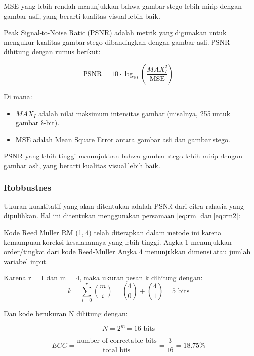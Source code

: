 \documentclass{ittelkom}
\begin{document}
MSE yang lebih rendah menunjukkan bahwa gambar stego lebih mirip dengan gambar
asli, yang berarti kualitas visual lebih baik.

Peak Signal-to-Noise Ratio (PSNR) adalah metrik yang digunakan untuk mengukur
kualitas gambar stego dibandingkan dengan gambar asli. PSNR dihitung dengan
rumus berikut:

\begin{equation}
    \text{PSNR} = 10 \cdot \log_{10} \left( \frac{MAX_I^2}{\text{MSE}} \right)
\end{equation}

Di mana:
\begin{itemize}
    \item $MAX_I$ adalah nilai maksimum intensitas gambar (misalnya, 255 untuk gambar 8-bit).
    \item $\text{MSE}$ adalah Mean Square Error antara gambar asli dan gambar stego.
\end{itemize}

PSNR yang lebih tinggi menunjukkan bahwa gambar stego lebih mirip dengan gambar
asli, yang berarti kualitas visual lebih baik.

\subsubsection{Robbustnes}

Ukuran kuantitatif yang akan ditentukan adalah PSNR dari citra rahasia yang
dipulihkan. Hal ini ditentukan menggunakan persamaan \ref{eq:rm} dan
\ref{eq:rm2}:

Kode Reed Muller RM (1, 4) telah diterapkan dalam metode ini karena kemampuan
koreksi kesalahannya yang lebih tinggi. Angka 1 menunjukkan order/tingkat dari
kode Reed-Muller Angka 4 menunjukkan dimensi atau jumlah variabel input.

Karena r = 1 dan m = 4, maka ukuran pesan k dihitung dengan:
\begin{equation}
    k = \sum_{i=0}^{r} \binom{m}{i} = \binom{4}{0} + \binom{4}{1} = 5 \text{ bits}
    \label{eq:rm}
\end{equation}

Dan kode berukuran N dihitung dengan:

\begin{equation}
    N = 2^m = 16 \text{ bits}
    \label{eq:rm2}
\end{equation}

\begin{equation}
    ECC = \frac{\text{number of correctable bits}}{\text{total bits}} = \frac{3}{16} = 18.75\%
\end{equation}
\end{document}
